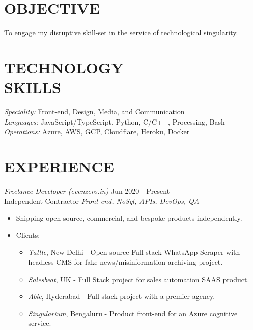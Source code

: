 \documentclass[margin, 10pt]{res} %
\begin{document}
\begin{resume}

\section{OBJECTIVE}  
To engage my disruptive skill-set in the service of technological singularity.

\section{TECHNOLOGY \\ SKILLS} 

{\sl Speciality:} Front-end, Design, Media, and Communication \\
{\sl Languages:} JavaScript/TypeScript, Python, C/C++, Processing, Bash\\
{\sl Operations:} Azure, AWS, GCP, Cloudflare, Heroku, Docker


\section{EXPERIENCE}

{\sl Freelance Developer (evenzero.in)} \hfill Jun 2020 - Present \\
 Independent Contractor \hfill {\scriptsize \it Front-end, NoSql, APIs, DevOps, QA}
\begin{itemize}
\item Shipping open-source, commercial, and bespoke products independently.
\item Clients:
\begin{itemize}
\item {\sl Tattle}, New Delhi - Open source Full-stack WhatsApp Scraper with headless CMS for fake news/misinformation archiving project. 
\item {\sl Salesbeat}, UK - Full Stack project for sales automation SAAS product.
\item {\sl Able}, Hyderabad - Full stack project with a premier agency.
\item {\sl Singularium}, Bengaluru - Product front-end for an Azure cognitive service.
\end{itemize}
\end{itemize}


\end{resume}
\end{document}
